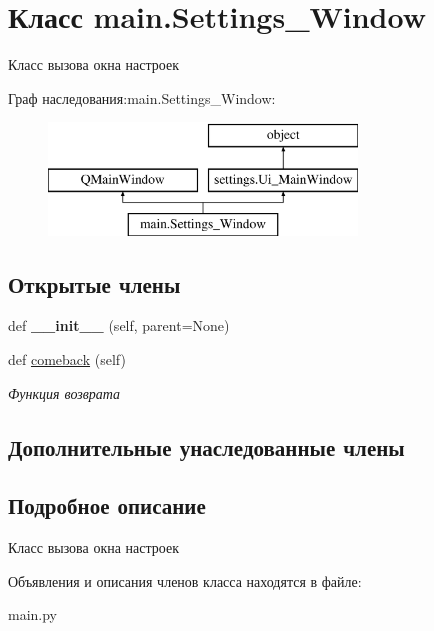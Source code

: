 \hypertarget{classmain_1_1_settings___window}{}\section{Класс main.\+Settings\+\_\+\+Window}
\label{classmain_1_1_settings___window}


Класс вызова окна настроек  


Граф наследования\+:main.\+Settings\+\_\+\+Window\+:\begin{figure}[H]
\begin{center}
\leavevmode
\includegraphics[height=3.000000cm]{classmain_1_1_settings___window}
\end{center}
\end{figure}
\subsection*{Открытые члены}
\begin{DoxyCompactItemize}
\item 
\mbox{\label{classmain_1_1_settings___window_a9a71b80b274df84584140745db8d627c}} 
def {\bfseries \+\_\+\+\_\+init\+\_\+\+\_\+} (self, parent=None)
\item 
\mbox{\label{classmain_1_1_settings___window_ab70b9a9449ffc4079e1b0a8516efb65a}} 
def \mbox{\hyperlink{classmain_1_1_settings___window_ab70b9a9449ffc4079e1b0a8516efb65a}{comeback}} (self)
\begin{DoxyCompactList}\small\item\em Функция возврата \end{DoxyCompactList}\end{DoxyCompactItemize}
\subsection*{Дополнительные унаследованные члены}


\subsection{Подробное описание}
Класс вызова окна настроек 

Объявления и описания членов класса находятся в файле\+:\begin{DoxyCompactItemize}
\item 
main.\+py\end{DoxyCompactItemize}
